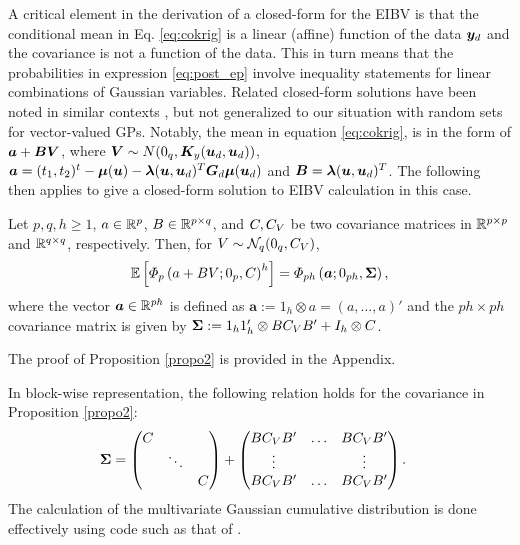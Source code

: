 \documentclass[aoas]{imsart}
\begin{document}
A critical element in the derivation of a closed-form for the EIBV is that the
conditional mean in Eq. \eqref{eq:cokrig} is a linear (affine) function of
the data ${\boldsymbol y}_d$ and the covariance is not a function of the data. This in turn means that the probabilities in expression \eqref{eq:post_ep} involve inequality statements for linear combinations of Gaussian variables. 
Related closed-form solutions have been noted in similar contexts \citep{bhattacharjya2013value, chevalier2014fast,stroh}, but not generalized to our situation with random sets for vector-valued GPs.
Notably, the mean in equation \eqref{eq:cokrig}, is in the form of ${\boldsymbol a}+{\boldsymbol B} {\boldsymbol V}$, where ${\boldsymbol V} \sim N(0_q, {\boldsymbol K}_y ({\boldsymbol u}_d,{\boldsymbol u}_d))$, ${\boldsymbol a}=(t_1,t_2)^t-{\boldsymbol \mu}({\boldsymbol u})-{\boldsymbol \lambda}({\boldsymbol u},{\boldsymbol u}_d)^T {\boldsymbol G}_d {\boldsymbol \mu}({\boldsymbol u}_d)$ and ${\boldsymbol B}={\boldsymbol \lambda}({\boldsymbol u},{\boldsymbol u}_d)^T$.
The following then applies to give a closed-form solution to EIBV calculation in this case. 

\begin{propo}
	\label{propo2}
	Let $p, q, h \geq 1$, $a \in \mathbb{R}^p$, $B \in \mathbb{R}^{p\times q}$,
	and $C, C_{V}$ be two covariance matrices in
	$\mathbb{R}^{p\times p}$ and $\mathbb{R}^{q\times q}$, respectively.
	Then, for $V \sim \mathcal{N}_{q}(0_q, C_{V})$,
	\begin{equation*}
	\mathbb{E}\left[ \varPhi_{p}\left( a + BV; 0_p,\covN \right)^h \right]
	=
	\varPhi_{ph}
	\left(
	\bm{a}
	;0_{ph},
	\bm{\Sigma}
	\right),
	\end{equation*}
	where the vector $\bm{a} \in \mathbb{R}^{p h}$ is defined as 
	$\bm{a} := 1_h\otimes a = 
	\left(a, \dots , a
	\right)'$
	and the $p h\times p h$ covariance matrix is given by
	$\bm{\Sigma} := 
	1_h 1_h'\otimes BC_{V} B' + I_h\otimes C$.
\end{propo}
The proof of Proposition \ref{propo2} is provided in the Appendix. 

In block-wise representation, the following relation holds for the covariance in Proposition \ref{propo2}:
\begin{align*}
	\bm{\Sigma}&=
	\begin{pmatrix}
	\covN & &\\
	& \ddots &\\
	&   & \covN
	\end{pmatrix}
	+
	\begin{pmatrix}
	B\covV B' & \dots & B\covV  B'\\
	\vdots & & \vdots\\
	B\covV B' & \dots & B\covV B'\\
	\end{pmatrix}.
\end{align*}
The calculation of the multivariate Gaussian cumulative distribution is done effectively using code such as that of \cite{genz2009computation}.
\end{document}
